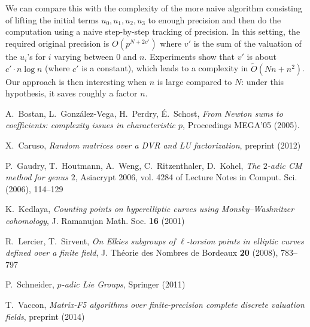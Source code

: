 \documentclass{amsart}
\begin{document}
We can compare this with the complexity of the more naive algorithm 
consisting of lifting the initial terms $u_0, u_1, u_2, u_3$ to enough 
precision and then do the computation using a naive step-by-step 
tracking of precision. In this setting, the required original precision 
is $O(p^{N+2v'})$ where $v'$ is the sum of the valuation of the $u_i$'s 
for $i$ varying between $0$ and $n$. Experiments show that $v'$ is about 
$c' \cdot n \log n$ (where $c'$ is a constant), which leads to a 
complexity in $\tilde O (N n + n^2)$. Our approach is then interesting
when $n$ is large compared to $N$: under this hypothesis, it saves
roughly a factor $n$.


\begin{thebibliography}{10}

  A.~Bostan, L.~Gonz\'alez-Vega, H.~Perdry, \'E.~Schost,
  \emph{From Newton sums to coefficients: complexity issues in characteristic $p$},
  Proceedings MEGA'05 (2005).

  X.~Caruso,
  \emph{Random matrices over a DVR and LU factorization},
  preprint (2012)

  P.~Gaudry, T.~Houtmann, A.~Weng, C.~Ritzenthaler, D.~Kohel,
  \emph{The $2$-adic CM method for genus $2$}, 
  Asiacrypt 2006, vol. 4284 of Lecture Notes in Comput. Sci. (2006), 114--129

  K.~Kedlaya,
  \emph{Counting points on hyperelliptic curves using Monsky--Washnitzer cohomology}, 
  J. Ramanujan Math. Soc. {\bf 16} (2001)

  R.~Lercier, T.~Sirvent,
  \emph{On Elkies subgroups of $\ell$-torsion points in elliptic curves defined over a finite field},
  J. Th\'eorie des Nombres de Bordeaux {\bf 20} (2008), 783--797

  P.~Schneider,
  \emph{$p$-adic Lie Groups}, Springer (2011)

  T.~Vaccon,
  \emph{Matrix-F5 algorithms over finite-precision complete discrete 
  valuation fields},
  preprint (2014)
\end{thebibliography}
\end{document}
